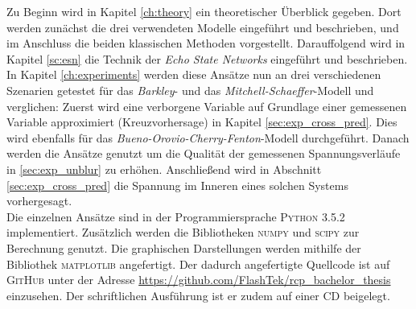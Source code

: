 Zu Beginn wird in Kapitel \ref{ch:theory} ein theoretischer Überblick gegeben. Dort werden zunächst die drei verwendeten Modelle eingeführt und beschrieben, und im Anschluss die beiden klassischen Methoden vorgestellt. Darauffolgend wird in Kapitel \ref{sc:esn} die Technik der \textit{Echo State Networks} eingeführt und beschrieben. In Kapitel \ref{ch:experiments} werden diese Ansätze nun an drei verschiedenen Szenarien getestet für das \textit{Barkley}- und das \textit{Mitchell-Schaeffer}-Modell und verglichen: Zuerst wird eine verborgene Variable auf Grundlage einer gemessenen Variable approximiert (Kreuzvorhersage) in Kapitel \ref{sec:exp_cross_pred}. Dies wird ebenfalls für das \textit{Bueno-Orovio-Cherry-Fenton}-Modell durchgeführt. Danach werden die Ansätze genutzt um die Qualität der gemessenen Spannungsverläufe in \ref{sec:exp_unblur} zu erhöhen. Anschließend wird in Abschnitt \ref{sec:exp_cross_pred} die Spannung im Inneren eines solchen Systems vorhergesagt.\\

Die einzelnen Ansätze sind in der Programmiersprache \textsc{Python 3.5.2} implementiert. Zusätzlich werden die Bibliotheken \textsc{numpy} und \textsc{scipy} zur Berechnung genutzt. Die graphischen Darstellungen werden mithilfe der Bibliothek \textsc{matplotlib} angefertigt. Der dadurch angefertigte Quellcode ist auf \textsc{GitHub} unter der Adresse \href{https://github.com/FlashTek/rcp\_bachelor\_thesis}{https://github.com/FlashTek/rcp\_bachelor\_thesis} einzusehen. Der schriftlichen Ausführung ist er zudem auf einer CD beigelegt.